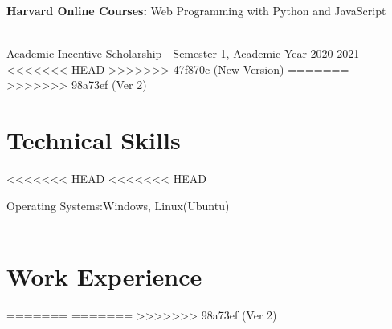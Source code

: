 \documentclass[]{resume-openfont}
\newcommand{\onlineWork}[1]{\textbf{Harvard Online Courses: } #1}
\newcommand{\awardHeading}[3]{\Project{#1}{#2}
\descript{#3}\\}
\newcommand{\awardHeading}[1]{\textbf{Academic Awards:} #1 \\}
\begin{document}
\onlineWork{Web Programming with Python and JavaScript}

\awardHeading{}
\hspace{0.5cm}
\href{https://drive.google.com/drive/u/1/folders/1DPBfQb7LGzu08zekDbS6NrmggQCySVqJ}{\underline{Academic Incentive Scholarship - Semester 1, Academic Year 2020-2021}}
<<<<<<< HEAD
>>>>>>> 47f870c (New Version)
=======
>>>>>>> 98a73ef (Ver 2)
\sectionsep


\section{Technical Skills}
<<<<<<< HEAD
<<<<<<< HEAD

\begin{skillList}
    {Operating Systems:}{Windows, Linux(Ubuntu)}
    \\
    {}{}
    \\
    {}{}%
\end{skillList}



\section{Work Experience}
=======
=======
>>>>>>> 98a73ef (Ver 2)
\end{document}
